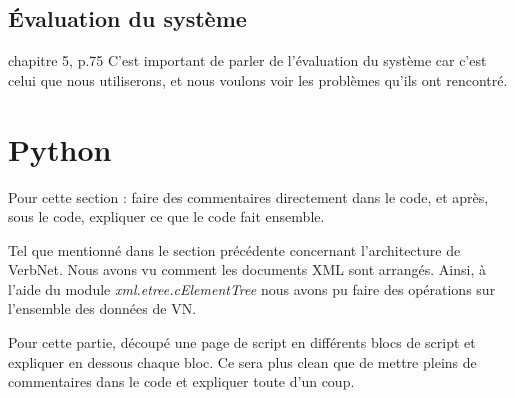 \subsection{Évaluation du système}
chapitre 5, p.75 C'est important de parler de l'évaluation du système car c'est celui que nous utiliserons, et nous voulons voir les problèmes qu'ils ont rencontré.



\section{Python}

Pour cette section : faire des commentaires directement dans le code, et après, sous le code, expliquer ce que le code fait ensemble.

Tel que mentionné dans le section précédente concernant l'architecture de VerbNet. Nous avons vu comment les documents XML sont  arrangés. Ainsi, à l'aide du module \emph{xml.etree.cElementTree} nous avons pu faire des opérations sur l'ensemble des données de VN.

Pour cette partie, découpé une page de script en différents blocs de script et expliquer en dessous chaque bloc. Ce sera plus clean que de mettre pleins de commentaires dans le code et expliquer toute d'un coup.

